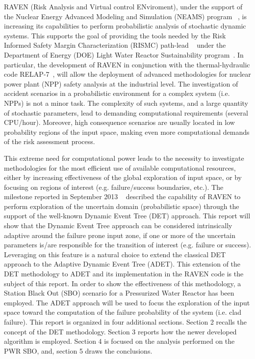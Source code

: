 \label{sec:introduction}
RAVEN (Risk Analysis and Virtual control ENviroment), under the support of the Nuclear Energy Advanced Modeling and Simulation (NEAMS) program ~\cite{neams}, is increasing its capabilities to perform probabilistic analysis of stochastic dynamic systems. This supports the goal of providing the tools needed by the Risk Informed Safety Margin Characterization (RISMC) path-lead ~\cite{mandelliANS_RISMC} under the Department of Energy (DOE) Light Water Reactor Sustainability program~\cite{lwrs}. In particular, the development of RAVEN in conjunction with the thermal-hydraulic code RELAP-7~\cite{relap7FY12}, will allow the deployment of advanced methodologies for nuclear power plant (NPP) safety analysis at the industrial level. The investigation of accident scenarios in a probabilistic environment for a complex system (i.e. NPPs) is not a minor task. The complexity of such systems, and a large quantity of stochastic parameters, lead to demanding computational requirements (several CPU/hour). Moreover, high consequence scenarios are usually located in low probability regions of the input space, making even more computational demands of the risk assessment process.

This extreme need for computational power leads to the necessity to investigate methodologies for the most efficient use of available computational resources, either by increasing effectiveness of the global exploration of input space, or by focusing on regions of interest (e.g. failure/success boundaries, etc.). The milestone reported in September 2013 ~\cite{DETmilestone2013} described the capability of RAVEN to perform exploration of the uncertain domain (probabilistic space) through the support of the well-known Dynamic Event Tree (DET) approach. This report will show that the Dynamic Event Tree approach can be considered intrinsically adaptive around the failure prone input zone, if one or more of the uncertain parameters is/are responsible for the transition of interest (e.g. failure or success). Leveraging on this feature is a natural choice to extend the classical DET approach to the Adaptive Dynamic Event Tree (ADET). This extension of the DET methodology to ADET and its implementation in the RAVEN code is the subject of this report. In order to show the effectiveness of this methodology, a Station Black Out (SBO) scenario for a Pressurized Water Reactor has been employed. The ADET approach will be used to focus the exploration of the input space toward the computation of the failure probability of the system (i.e. clad failure). This report is organized in four additional sections. Section 2 recalls the concept of the DET methodology. Section 3 reports how the newer developed algorithm is employed. Section 4 is focused on the analysis performed on the PWR SBO, and, section 5 draws the conclusions.



